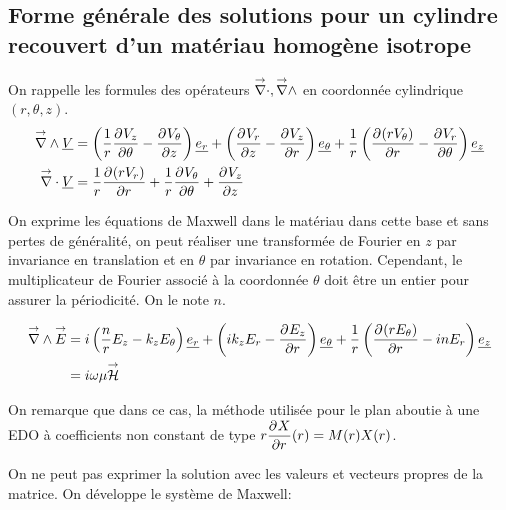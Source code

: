 


\subsection{Forme générale des solutions pour un cylindre recouvert d'un matériau homogène isotrope}

On rappelle les formules des opérateurs $\vdiv, \vrot$ en coordonnée cylindrique $(r,\theta,z)$.
\begin{align}
    \vrot \v{V} &= \left(\frac{1}{r}\ddr{\theta}{V_z} - \ddr{z}{V_\theta}\right)\v{e_r} + 
    \left(\ddr{z}{V_r} - \ddr{r}{V_z}\right)\v{e_\theta} +
    \frac{1}{r}\left(\ddr{r}{(rV_\theta)}-\ddr{\theta}{V_r}\right)\v{e_z} 
    \\
    \vdiv \v{V} &= \frac{1}{r}\ddr{r}{(rV_r)}+\frac{1}{r}\ddr{\theta}{V_\theta}+\ddr{z}{V_z}
\end{align}

\newcommand{\mr}{r}
\newcommand{\mt}{\theta}
\newcommand{\mz}{z}

\begin{figure}[!hbt]
    \centering
    \begin{tikzpicture}
        
    \end{tikzpicture}
\end{figure}

On exprime les équations de Maxwell dans le matériau dans cette base et sans pertes de généralité, on peut réaliser une transformée de Fourier en $z$ par invariance en translation et en $\theta$ par invariance en rotation. Cependant, le multiplicateur de Fourier associé à la coordonnée $\theta$ doit être un entier pour assurer la périodicité. On le note $n$.

\begin{align}
    \vrot \vE &= i\left(\frac{n}{r}E_z - k_zE_\theta\right)\v{e_r} + 
    \left(ik_zE_r - \ddr{r}{E_z}\right)\v{e_\theta} +
    \frac{1}{r}\left(\ddr{r}{(rE_\theta)}-inE_r\right)\v{e_z}
    \\
    &=i\w\mu \vH
\end{align}

On remarque que dans ce cas, la méthode utilisée pour le plan aboutie à une EDO à coefficients non constant de type $r\ddr{r}{X}(r) = M(r)X(r)$.

On ne peut pas exprimer la solution avec les valeurs et vecteurs propres de la matrice. 
On développe le système de Maxwell:

